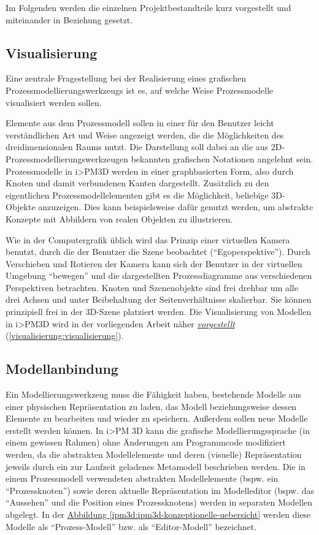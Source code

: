 \documentclass[a4paper,10pt]{sphinxmanual}
\begin{document}
Im Folgenden werden die einzelnen Projektbestandteile kurz vorgestellt und miteinander in Beziehung gesetzt.


\subsection{Visualisierung}
\label{ipm3d:ipm3d-visualisierung}\label{ipm3d:visualisierung}
Eine zentrale Fragestellung bei der Realisierung eines grafischen Prozessmodellierungswerkzeugs ist es, auf welche Weise Prozessmodelle visualisiert werden sollen.

Elemente aus dem Prozessmodell sollen in einer für den Benutzer leicht verständlichen Art und Weise angezeigt werden, die die Möglichkeiten des dreidimensionalen Raums nutzt.
Die Darstellung soll dabei an die aus 2D-Prozessmodellierungswerkzeugen bekannten grafischen Notationen angelehnt sein.
Prozessmodelle in i\textgreater{}PM3D werden in einer graphbasierten Form, also durch Knoten und damit verbundenen Kanten dargestellt.
Zusätzlich zu den eigentlichen Prozessmodellelementen gibt es die Möglichkeit, beliebige 3D-Objekte anzuzeigen. Dies kann beispielsweise dafür genutzt werden, um abstrakte Konzepte mit Abbildern von realen Objekten zu illustrieren.

Wie in der Computergrafik üblich wird das Prinzip einer virtuellen Kamera benutzt, durch die der Benutzer die Szene beobachtet ("`Egoperspektive"').
Durch Verschieben und Rotieren der Kamera kann sich der Benutzer in der virtuellen Umgebung "`bewegen"' und die dargestellten Prozessdiagramme aus verschiedenen Perspektiven betrachten.
Knoten und Szenenobjekte sind frei drehbar um alle drei Achsen und unter Beibehaltung der Seitenverhältnisse skalierbar. Sie können prinzipiell frei in der 3D-Szene platziert werden.
Die Visualisierung von Modellen in i\textgreater{}PM3D wird in der vorliegenden Arbeit näher {\hyperref[visualisierung:visualisierung]{\emph{vorgestellt}}} (\autoref*{visualisierung:visualisierung}).


\subsection{Modellanbindung}
\label{ipm3d:modellanbindung}
Ein Modellierungswerkzeug muss die Fähigkeit haben, bestehende Modelle aus einer physischen Repräsentation zu laden, das Modell beziehungsweise dessen Elemente zu bearbeiten und wieder zu speichern.
Außerdem sollen neue Modelle erstellt werden können.
In i\textgreater{}PM 3D kann die grafische Modellierungssprache (in einem gewissen Rahmen) ohne Änderungen am Programmcode modifiziert werden, da die abstrakten Modellelemente und deren (visuelle) Repräsentation jeweils durch ein zur Laufzeit geladenes Metamodell beschrieben werden.
Die in einem Prozessmodell verwendeten abstrakten Modellelemente (bspw. ein "`Prozessknoten"') sowie deren aktuelle Repräsentation im Modelleditor (bspw. das "`Aussehen"' und die Position eines Prozessknotens) werden in separaten Modellen abgelegt.
In der \hyperref[ipm3d:ipm3d-konzeptionelle-uebersicht]{Abbildung  \ref*{ipm3d:ipm3d-konzeptionelle-uebersicht}} werden diese Modelle als "`Prozess-Modell"' bzw. als "`Editor-Modell"' bezeichnet.
\end{document}
